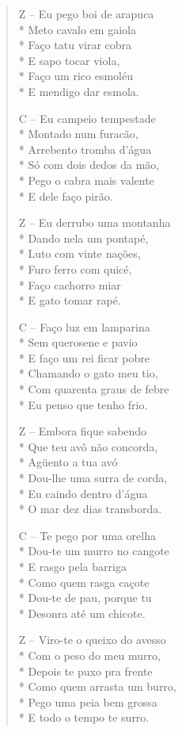 \begin{verse}
Z – Eu pego boi de arapuca\\*
Meto cavalo em gaiola\\*
Faço tatu virar cobra\\*
E sapo tocar viola,\\*
Faço um rico esmoléu\\*
E mendigo dar esmola.

C – Eu campeio tempestade\\*
Montado num furacão,\\*
Arrebento tromba d’água\\*
Só com dois dedos da mão,\\*
Pego o cabra mais valente\\*
E dele faço pirão.

Z – Eu derrubo uma montanha\\*
Dando nela um pontapé,\\*
Luto com vinte nações,\\*
Furo ferro com quicé,\\*
Faço cachorro miar\\*
E gato tomar rapé.

C – Faço luz em lamparina\\*
Sem querosene e pavio\\*
E faço um rei ficar pobre\\*
Chamando o gato meu tio,\\*
Com quarenta graus de febre\\*
Eu penso que tenho frio.

Z – Embora fique sabendo\\*
Que teu avô não concorda,\\*
Agüento a tua avó\\*
Dou-lhe uma surra de corda,\\*
Eu caindo dentro d’água\\*
O mar dez dias transborda.

C – Te pego por uma orelha\\*
Dou-te um murro no cangote\\*
E rasgo pela barriga\\*
Como quem rasga caçote\\*
Dou-te de pau, porque tu\\*
Desonra até um chicote.

Z – Viro-te o queixo do avesso\\*
Com o peso do meu murro,\\*
Depois te puxo pra frente\\*
Como quem arrasta um burro,\\*
Pego uma peia bem grossa\\*
E todo o tempo te surro.


\end{verse}
